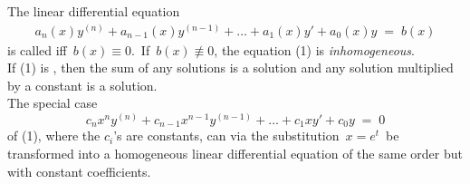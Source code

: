\documentclass[12pt]{article}
\begin{document}
The linear differential equation
\begin{align}
a_n(x)y^{(n)}+a_{n-1}(x)y^{(n-1)}+\ldots+a_1(x)y'+a_0(x)y \;=\; b(x)
\end{align}
is called 
iff\, $b(x) \equiv 0$.\, If\, $b(x) \not\equiv 0$, 
the equation (1) is {\it inhomogeneous}.\\
If (1) is , 
then the sum of any solutions is a solution and any solution 
multiplied by a constant is a solution.\\

The special case 
$$c_nx^ny^{(n)}+c_{n-1}x^{n-1}y^{(n-1)}+\ldots+c_1xy'+c_0y \;=\; 0$$
of (1), where the $c_i$'s are constants, can via the 
substitution\, $x = e^t$\, be transformed into a homogeneous 
linear differential equation of the same order but with 
constant coefficients.\\
\end{document}
